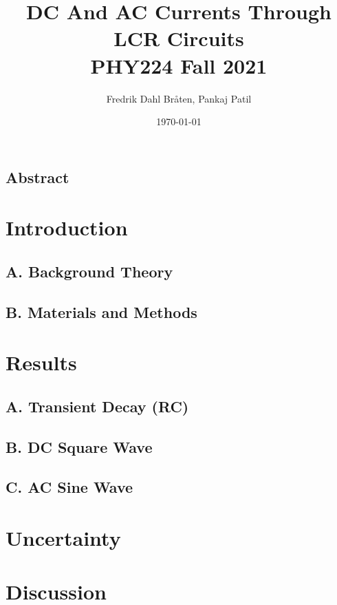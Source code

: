 \documentclass[a4paper,12pt]{article}
\begin{document}
\title{DC And AC Currents Through LCR Circuits \\
\large PHY224 Fall 2021}
\author{Fredrik Dahl Bråten, Pankaj Patil}
\date{\today}
\maketitle

\begin{center}
	\section*{Abstract}
\end{center}

\section{Introduction}

\subsection*{A. Background Theory}
\subsection*{B. Materials and Methods}

\section{Results}
\subsection*{A. Transient Decay (RC)}
\subsection*{B. DC Square Wave}
\subsection*{C. AC Sine Wave}

\section{Uncertainty}

\section{Discussion}
\end{document}
